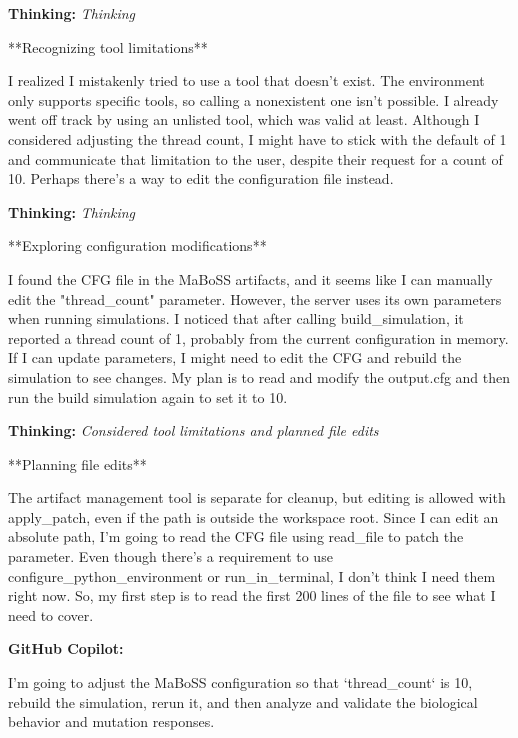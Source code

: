 \documentclass[11pt,a4paper]{article}
\begin{document}
\begin{thinkbox}
\textbf{Thinking:} \textit{Thinking}

**Recognizing tool limitations**

I realized I mistakenly tried to use a tool that doesn’t exist. The environment only supports specific tools, so calling a nonexistent one isn’t possible. I already went off track by using an unlisted tool, which was valid at least. Although I considered adjusting the thread count, I might have to stick with the default of 1 and communicate that limitation to the user, despite their request for a count of 10. Perhaps there’s a way to edit the configuration file instead.

\end{thinkbox}
\begin{thinkbox}
\textbf{Thinking:} \textit{Thinking}

**Exploring configuration modifications**

I found the CFG file in the MaBoSS artifacts, and it seems like I can manually edit the "thread\_count" parameter. However, the server uses its own parameters when running simulations. I noticed that after calling build\_simulation, it reported a thread count of 1, probably from the current configuration in memory. If I can update parameters, I might need to edit the CFG and rebuild the simulation to see changes. My plan is to read and modify the output.cfg and then run the build simulation again to set it to 10.

\end{thinkbox}
\begin{thinkbox}
\textbf{Thinking:} \textit{Considered tool limitations and planned file edits}

**Planning file edits**

The artifact management tool is separate for cleanup, but editing is allowed with apply\_patch, even if the path is outside the workspace root. Since I can edit an absolute path, I'm going to read the CFG file using read\_file to patch the parameter. Even though there's a requirement to use configure\_python\_environment or run\_in\_terminal, I don't think I need them right now. So, my first step is to read the first 200 lines of the file to see what I need to cover.

\end{thinkbox}
\begin{copilotbox}
\textbf{GitHub Copilot:}

I’m going to adjust the MaBoSS configuration so that `thread\_count` is 10, rebuild the simulation, rerun it, and then analyze and validate the biological behavior and mutation responses.

\end{copilotbox}
\end{document}
